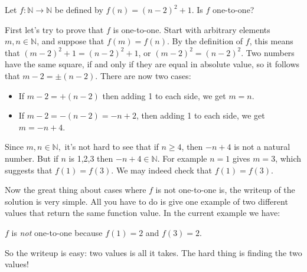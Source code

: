 \begin{example}{}
Let $f\colon \mathbb{N} \to \mathbb{N}$ be defined by $f(n)=(n-2)^2 + 1$.  Is $f$ one-to-one?
\medskip

First let's try to prove that $f$ is one-to-one.   
Start with arbitrary elements $m, n \in \mathbb{N}$, and suppose that $f(m)=f(n)$.  By the definition of $f$, this means that $(m-2)^2 + 1=(n-2)^2 + 1$, or $(m-2)^2 =(n-2)^2 $.  Two numbers have the same square, if and only if they are equal in absolute value, so it follows that $m-2 = \pm (n-2)$.  There are now two cases:
\begin{itemize}
\item
If $m-2=+(n-2)$ then adding 1 to each side, we get $m=n$.  
\item
If $m-2 = -(n-2) = -n+2$, then adding 1 to each side, we get $m=-n+4$.  
\end{itemize}
Since $m,n \in \mathbb{N},$ it's not hard to see that if $n \ge 4$, then $-n+4$ is not a natural number.  But if $n$ is 1,2,3 then $-n+4 \in \mathbb{N}$. For example $n=1$ gives $m = 3$, which suggests that $f(1) = f(3)$. We may indeed check that  $f(1) = f(3)$. 

Now the great thing about cases where $f$ is not one-to-one is, the writeup of the solution is very simple. All you have to do is give one example of two different values that return the same function value. In the current example we have: 

\noindent
\begin{solution}
$f$ is \emph{not} one-to-one because $f(1) = 2$ and $f(3) = 2$. 
\end{solution}

\noindent  
So the writeup is easy: two values is all it takes. The hard thing is finding the two values!
\end{example}

